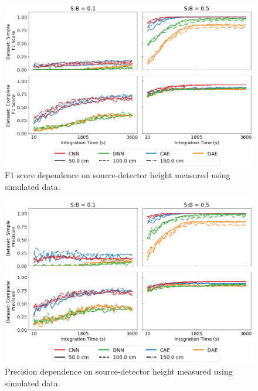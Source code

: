 \begin{figure}[H]
	\centering
	\includegraphics[width=1.0\linewidth]{images/sim-generalization-height-f1}
	\caption{F1 score dependence on source-detector height measured using simulated data.}
	\label{fig:sim-generalization-height-f1}
\end{figure}

\begin{figure}[H]
	\centering
	\includegraphics[width=1.0\linewidth]{images/sim-generalization-height-precision}
	\caption{Precision dependence on source-detector height measured using simulated data.}
	\label{fig:sim-generalization-height-precision}
\end{figure}


